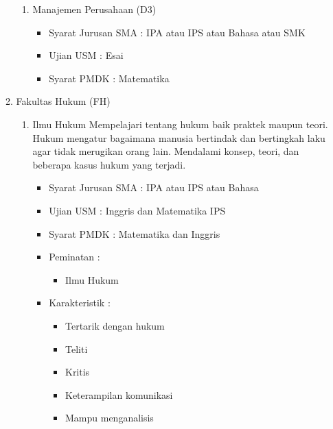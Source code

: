 \documentclass[a4paper,twoside]{article}
\begin{document}
\begin{enumerate}
\begin{enumerate}
\begin{enumerate}
				\item Manajemen Perusahaan (D3)
				
					\begin{itemize}
						\item Syarat Jurusan SMA : IPA atau IPS atau Bahasa atau SMK
						\item Ujian USM : Esai
						\item Syarat PMDK : Matematika
					\end{itemize}
			\end{enumerate}
			
			\item Fakultas Hukum (FH)
			\begin{enumerate}
				\item Ilmu Hukum
					Mempelajari tentang hukum baik praktek maupun teori. Hukum mengatur bagaimana manusia bertindak dan bertingkah laku agar tidak merugikan orang lain. Mendalami konsep, teori, dan beberapa kasus hukum yang terjadi.
					\begin{itemize}
						\item Syarat Jurusan SMA : IPA atau IPS atau Bahasa
						\item Ujian USM : Inggris dan Matematika IPS
						\item Syarat PMDK : Matematika dan Inggris
						\item Peminatan :
						\begin{itemize}
							\item Ilmu Hukum
						\end{itemize}
						\item Karakteristik :
						\begin{itemize}
							\item Tertarik dengan hukum
							\item Teliti
							\item Kritis
							\item Keterampilan komunikasi
							\item Mampu menganalisis
						\end{itemize}
					\end{itemize}
			\end{enumerate}
			

\end{enumerate}
\end{enumerate}
\end{document}
